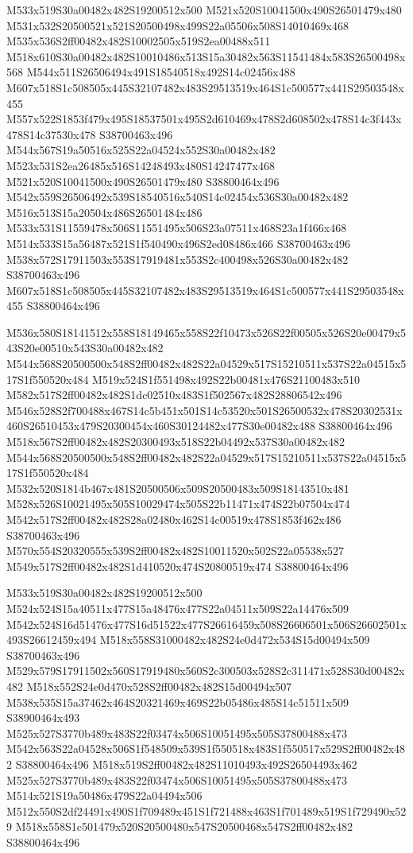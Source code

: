 \documentclass{article}
\begin{document}
\begin{multicols}{2}
M533x519S30a00482x482S19200512x500 M521x520S10041500x490S26501479x480 M531x532S20500521x521S20500498x499S22a05506x508S14010469x468 M535x536S2ff00482x482S10002505x519S2ea00488x511 M518x610S30a00482x482S10010486x513S15a30482x563S11541484x583S26500498x568 M544x511S26506494x491S18540518x492S14c02456x488 M607x518S1c508505x445S32107482x483S29513519x464S1c500577x441S29503548x455 M557x522S1853f479x495S18537501x495S2d610469x478S2d608502x478S14c3f443x478S14c37530x478 S38700463x496 M544x567S19a50516x525S22a04524x552S30a00482x482 M523x531S2ea26485x516S14248493x480S14247477x468 M521x520S10041500x490S26501479x480 S38800464x496 M542x559S26506492x539S18540516x540S14c02454x536S30a00482x482 M516x513S15a20504x486S26501484x486 M533x531S11559478x506S11551495x506S23a07511x468S23a1f466x468 M514x533S15a56487x521S1f540490x496S2ed08486x466 S38700463x496 M538x572S17911503x553S17919481x553S2c400498x526S30a00482x482 S38700463x496 M607x518S1c508505x445S32107482x483S29513519x464S1c500577x441S29503548x455 S38800464x496

M536x580S18141512x558S18149465x558S22f10473x526S22f00505x526S20e00479x543S20e00510x543S30a00482x482 M544x568S20500500x548S2ff00482x482S22a04529x517S15210511x537S22a04515x517S1f550520x484 M519x524S1f551498x492S22b00481x476S21100483x510 M582x517S2ff00482x482S1dc02510x483S1f502567x482S28806542x496 M546x528S2f700488x467S14c5b451x501S14c53520x501S26500532x478S20302531x460S26510453x479S20300454x460S30124482x477S30e00482x488 S38800464x496 M518x567S2ff00482x482S20300493x518S22b04492x537S30a00482x482 M544x568S20500500x548S2ff00482x482S22a04529x517S15210511x537S22a04515x517S1f550520x484 M532x520S1814b467x481S20500506x509S20500483x509S18143510x481 M528x526S10021495x505S10029474x505S22b11471x474S22b07504x474 M542x517S2ff00482x482S28a02480x462S14c00519x478S1853f462x486 S38700463x496 M570x554S20320555x539S2ff00482x482S10011520x502S22a05538x527 M549x517S2ff00482x482S1d410520x474S20800519x474 S38800464x496

M533x519S30a00482x482S19200512x500 M524x524S15a40511x477S15a48476x477S22a04511x509S22a14476x509 M542x524S16d51476x477S16d51522x477S26616459x508S26606501x506S26602501x493S26612459x494 M518x558S31000482x482S24e0d472x534S15d00494x509 S38700463x496 M529x579S17911502x560S17919480x560S2c300503x528S2c311471x528S30d00482x482 M518x552S24e0d470x528S2ff00482x482S15d00494x507 M538x535S15a37462x464S20321469x469S22b05486x485S14c51511x509 S38900464x493 M525x527S3770b489x483S22f03474x506S10051495x505S37800488x473 M542x563S22a04528x506S1f548509x539S1f550518x483S1f550517x529S2ff00482x482 S38800464x496 M518x519S2ff00482x482S11010493x492S26504493x462 M525x527S3770b489x483S22f03474x506S10051495x505S37800488x473 M514x521S19a50486x479S22a04494x506 M512x550S2df24491x490S1f709489x451S1f721488x463S1f701489x519S1f729490x529 M518x558S1c501479x520S20500480x547S20500468x547S2ff00482x482 S38800464x496


\end{multicols}
\end{document}
